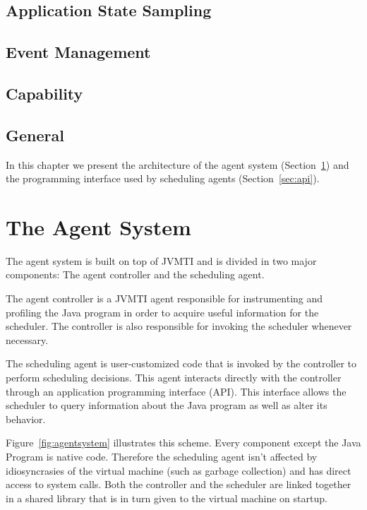 \subsection{Application State Sampling}

\subsection{Event Management}

\subsection{Capability}

\subsection{General}


\iffalse
In this chapter we present the architecture of the agent system (Section~\ref{sec:agentsystem}) and the programming interface used by scheduling agents (Section~\ref{sec:api}).

\section{The Agent System} \label{sec:agentsystem}

The agent system is built on top of JVMTI and is divided in two major components: The agent controller and the scheduling agent.

The agent controller is a JVMTI agent responsible for instrumenting and profiling the Java program in order to acquire useful information for the scheduler. The controller is also responsible for invoking the scheduler whenever necessary.

The scheduling agent is user-customized code that is invoked by the controller to perform scheduling decisions. This agent interacts directly with the controller through an application programming interface (API). This interface allows the scheduler to query information about the Java program as well as alter its behavior.

Figure~\ref{fig:agentsystem} illustrates this scheme. Every component except the Java Program is native code. Therefore the scheduling agent isn't affected by idiosyncrasies of the virtual machine (such as garbage collection) and has direct access to system calls. Both the controller and the scheduler are linked together in a shared library that is in turn given to the virtual machine on startup.

